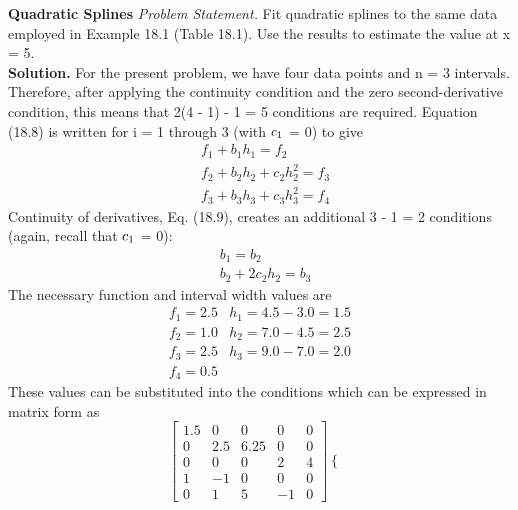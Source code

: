 \documentclass[../main.tex]{subfiles}
\begin{document}
\begin{exmp} \textbf{Quadratic Splines}
    \noindent\textit{Problem Statement.} Fit quadratic splines to the same data employed in Example 18.1
    (Table 18.1). Use the results to estimate the value at x = 5.\\
    \noindent \textbf{Solution.} For the present problem, we have four data points and n = 3 intervals. Therefore, after applying the continuity condition and the zero second-derivative condition, this
    means that 2(4 - 1) - 1 = 5 conditions are required. Equation (18.8) is written for i = 1
    through 3 (with $c\textsubscript{1}$ = 0) to give
    \begin{equation}
        \begin{aligned}
        &f_{1}+b_{1} h_{1}=f_{2} \\
        &f_{2}+b_{2} h_{2}+c_{2} h_{2}^{2}=f_{3} \\
        &f_{3}+b_{3} h_{3}+c_{3} h_{3}^{2}=f_{4} \nonumber
        \end{aligned}
        \end{equation}
        Continuity of derivatives, Eq. (18.9), creates an additional 3 - 1 = 2 conditions (again,
        recall that $c\textsubscript{1}$ = 0):
        $$
        \begin{aligned}
        &b_{1}=b_{2} \\
        &b_{2}+2 c_{2} h_{2}=b_{3}
        \end{aligned}
        $$
        The necessary function and interval width values are
        $$
        \begin{array}{ll}
        f_{1}=2.5 & h_{1}=4.5-3.0=1.5 \\
        f_{2}=1.0 & h_{2}=7.0-4.5=2.5 \\
        f_{3}=2.5 & h_{3}=9.0-7.0=2.0 \\
        f_{4}=0.5 &
        \end{array}
        $$
        These values can be substituted into the conditions which can be expressed in matrix form as
        $$
        \left[\begin{array}{ccccc}
        1.5 & 0 & 0 & 0 & 0 \\
        0 & 2.5 & 6.25 & 0 & 0 \\
        0 & 0 & 0 & 2 & 4 \\
        1 & -1 & 0 & 0 & 0 \\
        0 & 1 & 5 & -1 & 0
        \end{array}\right]\left\{\begin{array}{l}

\end{array}$$
\end{exmp}
\end{document}
